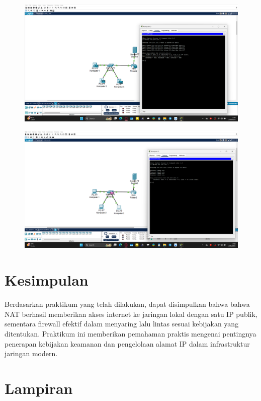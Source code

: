 \begin{enumerate}
\begin{figure}[H]
        \caption{}
        \label{fig:gambar4}
    \end{figure}
    \begin{figure}[H]
        \centering
        \includegraphics[width=0.8\linewidth]{P1/img/27.png}
        \caption{}
        \label{fig:gambar4}
    \end{figure}
    \begin{figure}[H]
        \centering
        \includegraphics[width=0.8\linewidth]{P1/img/28.png}
        \caption{}
        \label{fig:gambar4}
    \end{figure}
    
\end{enumerate}

\section{Kesimpulan}
Berdasarkan praktikum yang telah dilakukan, dapat disimpulkan bahwa bahwa NAT berhasil memberikan akses internet ke jaringan lokal dengan satu IP publik, sementara firewall efektif dalam menyaring lalu lintas sesuai kebijakan yang ditentukan. Praktikum ini memberikan pemahaman praktis mengenai pentingnya penerapan kebijakan keamanan dan pengelolaan alamat IP dalam infrastruktur jaringan modern.

\section{Lampiran}
